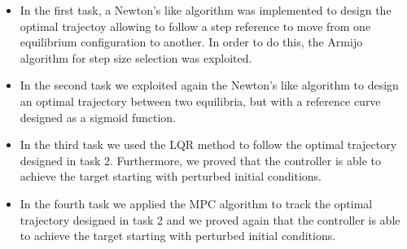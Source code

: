 \documentclass[a4paper,11pt,oneside]{book}
\begin{document}
\begin{itemize}
    \item In the first task, a Newton's like algorithm was implemented to design the
optimal trajectoy allowing to follow a step reference to move from one equilibrium configuration to another. In order to do this, the Armijo algorithm for step size selection was exploited.
    \item In the second task we exploited again the Newton's like algorithm to design an optimal
trajectory between two equilibria, but with a reference curve designed as a sigmoid function.
    \item In the third task we used the LQR method to follow the optimal trajectory
designed in task 2. Furthermore, we proved that the controller is able
to achieve the target starting with perturbed initial conditions.
    \item In the fourth task we applied the MPC algorithm to track the
optimal trajectory designed in task 2 and we proved again that the controller is able to achieve the target starting with perturbed initial conditions.

\end{itemize}

%


\end{document}
